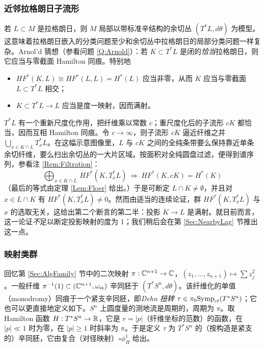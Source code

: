 \subsubsection{近邻拉格朗日子流形} 若 $L\subset M$ 是拉格朗日，则 $M$ 局部以带标准辛结构的余切丛 $(T^*L, d\theta)$ 为模型。这意味着拉格朗日嵌入的分类问题至少和余切丛中拉格朗日的局部分类问题一样复杂。Arnol'd 猜想（参看问题 \ref{Q:Arnold}）：若 $K\subset T^*L$ 是闭的\emph{恰当}拉格朗日，则它应当与零截面 Hamilton 同痕。特别地
\begin{itemize}
\item  $HF^*(K,L) \cong HF^*(L,L) = H^*(L)$ 应当非零，从而 $K$ 应当与零截面 $L\subset T^*L$ 相交；
\item  $K \subset T^*L \rightarrow L$ 应当是度一映射，因而满射。
\end{itemize}

$T^*L$ 有一个重新尺度化作用，把纤维乘以常数 $c$；重尺度化后的子流形 $cK$ 都恰当，因而互相 Hamilton 同痕。令 $c\rightarrow \infty$，则子流形 $cK$ 逼近纤维之并 $\bigcup_{x \in K \cap L} T_x^*L$。在这幅示意图像里，$L$ 与 $cK$ 之间的全纯条带要么保持靠近单条余切纤维，要么扫出余切丛的一大片区域。按面积对全纯圆盘过滤，便得到谱序列，参看注 \ref{Rem:Filtration}：
\begin{equation} \label{Eqn:FibresShouldGenerate}
\bigoplus_{x\in K\cap L} \, HF^*(K, T_x^*L) \ \Longrightarrow \ HF^*(K,cK) = H^*(K)
\end{equation}
（最后的等式由定理 \ref{Lem:Floer} 给出。）于是可断定 $L\cap K \neq \emptyset$，并且对 $x\in L\cap K$ 有 $HF^*(K, T_x^*L) \neq 0$。然而由适当的连续论证，群 $HF^*(K, T_x^*L)$ 与 $x$ 的选取无关，这给出第二个断言的第二半：投影 $K \rightarrow L$ 是满射。就目前而言，这一论证\emph{不}足以断定投影映射的度为 1；我们稍后会在第 \ref{Sec:NearbyLag} 节推出这一点。

\subsubsection{映射类群} 回忆第 \ref{Sec:AlgFamily} 节中的二次映射 $\pi: \mathbb{C}^{n+1} \rightarrow \mathbb{C}$，$(z_1,\ldots,z_{n+1}) \mapsto \sum z_j^2$。一般纤维 $\pi^{-1}(1) \subset (\mathbb{C}^{n+1}, \omega_{\operatorname{st}})$ 辛同胚于 $(T^*S^n, d\theta)$。该纤维化的单值（monodromy）同痕于一个紧支辛同胚，即\emph{Dehn 扭转} $\tau \in \pi_0\mathrm{Symp}_{ct}(T^*S^n)$；它也可以更直接地定义如下。$S^n$ 上圆度量的测地流是周期的，周期为 $\pi$。取 Hamilton 函数 $H:T^*S^n \rightarrow \mathbb{R}$，它是 $r=|p|$（纤维坐标的范数）的函数，在 $|p| \ll 1$ 时为零，在 $|p| \geq 1$ 时斜率为 $\pi$。于是定义 $\tau$ 为 $T^*S^n$ 的（按构造是紧支的）辛同胚，它由复合（对径映射）$\circ \phi_H^1$ 给出。

